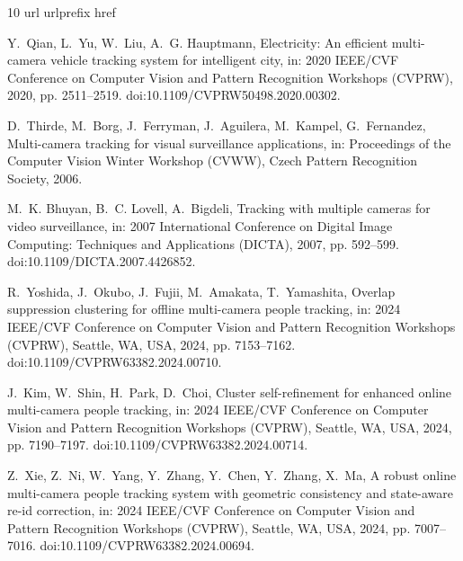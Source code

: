\documentclass[5p,times]{elsarticle}
\begin{document}
\begin{thebibliography}{10}
\expandafter\ifx\csname url\endcsname\relax
  \def\url#1{\texttt{#1}}\fi
\expandafter\ifx\csname urlprefix\endcsname\relax\def\urlprefix{URL }\fi
\expandafter\ifx\csname href\endcsname\relax
  \def\href#1#2{#2} \def\path#1{#1}\fi

Y.~Qian, L.~Yu, W.~Liu, A.~G. Hauptmann, Electricity: An efficient multi-camera vehicle tracking system for intelligent city, in: 2020 IEEE/CVF Conference on Computer Vision and Pattern Recognition Workshops (CVPRW), 2020, pp. 2511--2519.
\newblock \href {http://dx.doi.org/10.1109/CVPRW50498.2020.00302} {\path{doi:10.1109/CVPRW50498.2020.00302}}.

D.~Thirde, M.~Borg, J.~Ferryman, J.~Aguilera, M.~Kampel, G.~Fernandez, Multi-camera tracking for visual surveillance applications, in: Proceedings of the Computer Vision Winter Workshop (CVWW), Czech Pattern Recognition Society, 2006.

M.~K. Bhuyan, B.~C. Lovell, A.~Bigdeli, Tracking with multiple cameras for video surveillance, in: 2007 International Conference on Digital Image Computing: Techniques and Applications (DICTA), 2007, pp. 592--599.
\newblock \href {http://dx.doi.org/10.1109/DICTA.2007.4426852} {\path{doi:10.1109/DICTA.2007.4426852}}.

R.~Yoshida, J.~Okubo, J.~Fujii, M.~Amakata, T.~Yamashita, Overlap suppression clustering for offline multi-camera people tracking, in: 2024 IEEE/CVF Conference on Computer Vision and Pattern Recognition Workshops (CVPRW), Seattle, WA, USA, 2024, pp. 7153--7162.
\newblock \href {http://dx.doi.org/10.1109/CVPRW63382.2024.00710} {\path{doi:10.1109/CVPRW63382.2024.00710}}.

J.~Kim, W.~Shin, H.~Park, D.~Choi, Cluster self-refinement for enhanced online multi-camera people tracking, in: 2024 IEEE/CVF Conference on Computer Vision and Pattern Recognition Workshops (CVPRW), Seattle, WA, USA, 2024, pp. 7190--7197.
\newblock \href {http://dx.doi.org/10.1109/CVPRW63382.2024.00714} {\path{doi:10.1109/CVPRW63382.2024.00714}}.

Z.~Xie, Z.~Ni, W.~Yang, Y.~Zhang, Y.~Chen, Y.~Zhang, X.~Ma, A robust online multi-camera people tracking system with geometric consistency and state-aware re-id correction, in: 2024 IEEE/CVF Conference on Computer Vision and Pattern Recognition Workshops (CVPRW), Seattle, WA, USA, 2024, pp. 7007--7016.
\newblock \href {http://dx.doi.org/10.1109/CVPRW63382.2024.00694} {\path{doi:10.1109/CVPRW63382.2024.00694}}.


\end{thebibliography}
\end{document}
